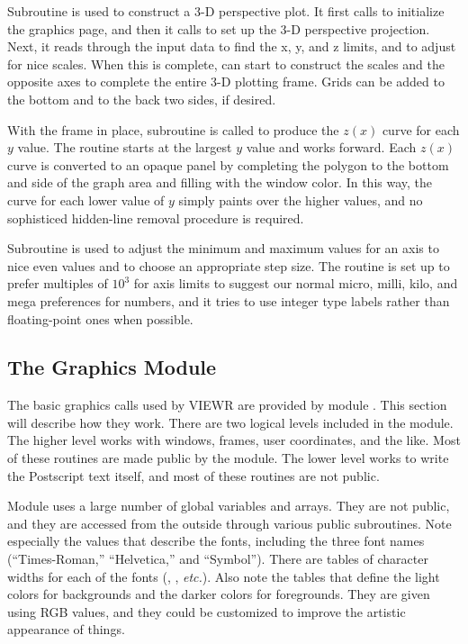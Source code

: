 Subroutine  is used to
construct a 3-D perspective plot.  It first calls
 to initialize the
graphics page, and then it calls
 to set up the
3-D perspective projection.  Next, it reads through the
input data to find the x, y, and z limits,
and to adjust for nice scales.  When this is complete, 
can start to construct the scales and the opposite axes to complete
the entire 3-D plotting frame.  Grids can be added to the bottom and
to the back two sides, if desired.

With the frame in place, subroutine
 is called to
produce the $z(x)$ curve for each $y$ value.  The routine starts at
the largest $y$ value and works forward.  Each $z(x)$ curve is
converted to an opaque panel by completing the polygon to the bottom
and side of the graph area and filling with the window color.  In
this way, the curve for each lower value of $y$ simply paints over
the higher values, and no sophisticed hidden-line removal procedure
is required.

Subroutine 
is used to adjust the minimum and maximum values for an
axis to nice even values and to choose an appropriate
step size.  The routine is set up to prefer multiples of $10^3$ for
axis limits to suggest our normal micro, milli, kilo, and mega
preferences for numbers, and it tries to use integer type labels
rather than floating-point ones when possible.

\subsection{The Graphics Module}
\label{ssVIEWR_graphics}

The basic graphics calls used by VIEWR are provided by module
.  This section
will describe how they work.  There are two logical levels
included in the module.  The higher level works with windows, frames,
user coordinates, and the like.  Most of these routines are made
public by the module.  The lower level works to write the Postscript
text itself, and most of these routines are not public.

Module  uses a large number of global variables and arrays.
They are not public, and they are accessed from the outside through
various public subroutines.  Note especially the values that describe
the fonts, including the three font names (``Times-Roman,'' ``Helvetica,''
and ``Symbol'').  There are tables of character widths for each of the
fonts (, , {\it etc.}).  Also note the tables
that define the light colors for backgrounds and the darker colors for
foregrounds.  They are given using RGB values, and they could be
customized to improve the artistic appearance of things.

